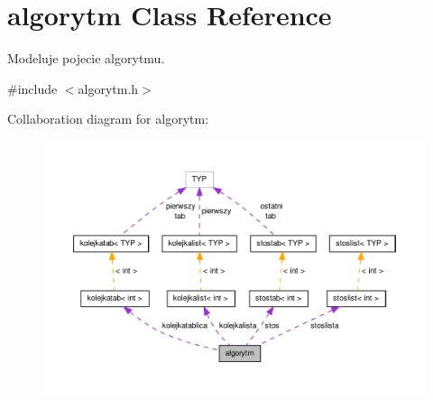 \hypertarget{classalgorytm}{\section{algorytm Class Reference}
\label{classalgorytm}
}


Modeluje pojecie algorytmu.  




{\ttfamily \#include $<$algorytm.\-h$>$}



Collaboration diagram for algorytm\-:
\nopagebreak
\begin{figure}[H]
\begin{center}
\leavevmode
\includegraphics[width=350pt]{classalgorytm__coll__graph}
\end{center}
\end{figure}
